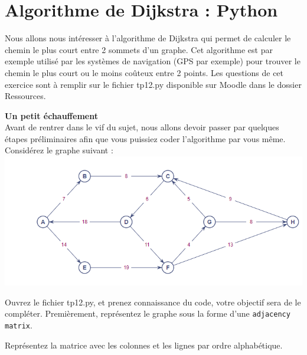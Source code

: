 \section{Algorithme de Dijkstra : Python}
Nous allons nous intéresser à l'algorithme de Dijkstra qui permet de calculer le chemin le plus court entre 2 sommets d'un graphe. Cet algorithme est par exemple utilisé par les systèmes de navigation (GPS par exemple) pour trouver le chemin le plus court ou le moins coûteux entre 2 points. Les questions de cet exercice sont à remplir sur le fichier tp12.py disponible sur Moodle dans le dossier Ressources. \\
\begin{Exercice}[10 minutes]\textbf{Un petit échauffement}\\

Avant de rentrer dans le vif du sujet, nous allons devoir passer par quelques étapes préliminaires afin que vous puissiez coder l'algorithme par vous même. Considérez le graphe suivant :\\
\includegraphics[scale=0.8]{resources/Dijkstra.PNG}

Ouvrez le fichier tp12.py, et prenez connaissance du code, votre objectif sera de le compléter. Premièrement, représentez le graphe sous la forme d'une \lstinline{adjacency matrix}.
\end{Exercice}
\begin{conseil}
    Représentez la matrice avec les colonnes et les lignes par ordre alphabétique.
\end{conseil}
\begin{solution}
    
\end{solution}

